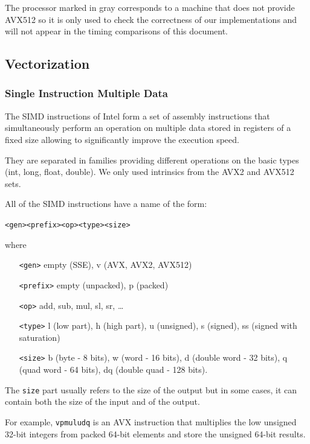 \documentclass[a4paper]{article}
\begin{document}
\bigskip
The processor marked in gray corresponds to a machine that does not provide AVX512 so it is only used to check the
correctness of our implementations and will not appear in the timing comparisons of this document.

\subsection{Vectorization}

\subsubsection{Single Instruction Multiple Data}

The SIMD instructions of Intel form a set of assembly instructions that simultaneously perform an operation on multiple data stored in registers
of a fixed size allowing to significantly improve the execution speed.

They are separated in families providing different operations on the basic types (int, long, float, double). We only used intrinsics from
the AVX2 and AVX512 sets.

\bigskip
All of the SIMD instructions have a name of the form:
\begin{center} 
    \texttt{<gen><prefix><op><type><size>}
\end{center}

where
\begin{center}
    \begin{minipage}{12cm}
        \begin{itemize}
            \item[\texttt{<gen>}] empty (SSE), v (AVX, AVX2, AVX512)
            \item[\texttt{<prefix>}] empty (unpacked), p (packed)
            \item[\texttt{<op>}] add, sub, mul, sl, sr, \dots
            \item[\texttt{<type>}] l (low part), h (high part), u (unsigned), s (signed), ss (signed with saturation)
            \item[\texttt{<size>}] b (byte - 8 bits), w (word - 16 bits), d (double word - 32 bits), q (quad word - 64 bits), 
            dq (double quad - 128 bits).
        \end{itemize}
    \end{minipage}
\end{center}


\begin{remark}
    The \texttt{size} part usually refers to the size of the output but in some cases, it can contain both the
    size of the input and of the output.
    
    For example, \texttt{vpmuludq} is an AVX instruction that multiplies the low unsigned 32-bit integers from 
    packed 64-bit elements and store the unsigned 64-bit results.
\end{remark}
\end{document}
